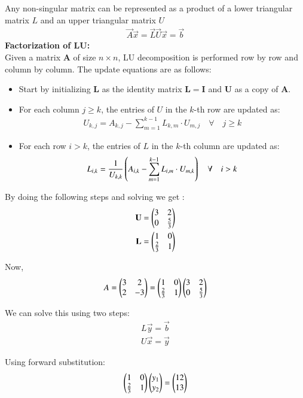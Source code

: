 \documentclass[journal]{IEEEtran}
\begin{document}
Any non-singular matrix can be represented as a product of a lower triangular matrix $L$ and an upper triangular matrix $U$
\begin{align}
	\vec{ A}\vec{x} = \vec{L}\vec{U}\vec{x} = \vec{b}
\end{align}
\textbf{Factorization of LU:}\\
Given a matrix $ \mathbf{A} $ of size $ n \times n $, LU decomposition is performed row by row and column by column. The update equations are as follows: 
\begin{itemize}
    \item Start by initializing $ \mathbf{L} $ as the identity matrix $ \mathbf{L} = \mathbf{I} $ and $ \mathbf{U} $ as a copy of $ \mathbf{A} $.\\
    \item For each column $ j \geq k $, the entries of $ U $ in the $ k $-th row are updated as:
    \begin{align}
        U_{k,j} = A_{k,j} - \sum_{m=1}^{k-1} L_{k,m} \cdot U_{m,j}\quad \forall \quad j \geq k
    \end{align}
    \item For each row $ i > k $, the entries of $ L $ in the $ k $-th column are updated as:
    \begin{align}
        L_{i,k} = \frac{1}{U_{k,k}} \left( A_{i,k} - \sum_{m=1}^{k-1} L_{i,m} \cdot U_{m,k}\right) \quad \forall \quad i > k
    \end{align}
\end{itemize}
By doing the following steps and solving we get :
\begin{align}
	\mathbf{U}=\begin{pmatrix}3 & 2\\0 & \frac{5}{3}\end{pmatrix} \\
	\mathbf{ L} = \begin{pmatrix}1 & 0\\\frac{2}{3} & 1\end{pmatrix}
\end{align}

Now,
\begin{align}
    A = \begin{pmatrix}3& 2\\2 & -3\end{pmatrix} = \begin{pmatrix}1 & 0\\\frac{2}{3} & 1\end{pmatrix}\begin{pmatrix}3 & 2\\0 & \frac{5}{3}\end{pmatrix}
\end{align}

We can solve this using two steps:
\begin{align}
    L\vec{y} = \vec{b}\\
    U\vec{x} = \vec{y}
\end{align}

Using forward substitution:
\begin{align}
    \begin{pmatrix}1 & 0\\\frac{2}{3} & 1\end{pmatrix}\begin{pmatrix}y_1\\y_2\end{pmatrix} = \begin{pmatrix}12\\13\end{pmatrix}
\end{align}
\end{document}
